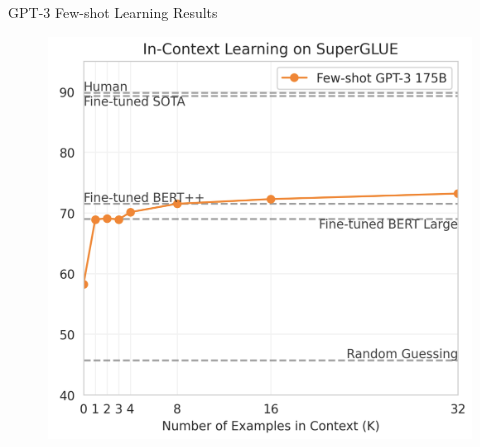 \documentclass[handout]{beamer}
\begin{document}
\begin{frame}{GPT-3 Few-shot Learning Results}


 \begin{figure}[h]
        	\includegraphics[scale = 0.15]{pics/fewshotresults.png}
        \end{figure}



\end{frame}
\end{document}
